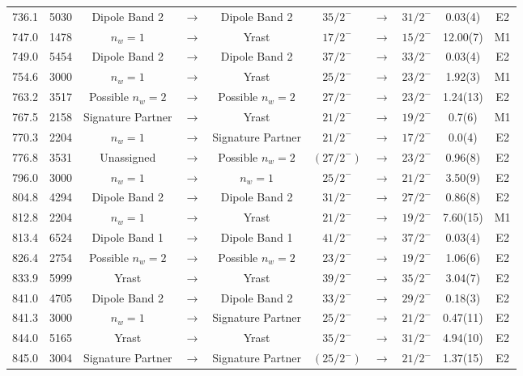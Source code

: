 \begin{landscape}
\begin{center}
\begin{longtable}{|c|c|ccc|ccc|c|c|}
 736.1&5030&Dipole Band 2&$ \rightarrow $&Dipole Band 2&$ 35/2^{-} $&$ \rightarrow $&$ 31/2^{-} $& 0.03(4)& E2 \\
 747.0&1478&$n_w=1$&$ \rightarrow $&Yrast&$ 17/2^{-} $&$ \rightarrow $&$ 15/2^{-} $& 12.00(7)& M1 \\
 749.0&5454&Dipole Band 2&$ \rightarrow $&Dipole Band 2&$ 37/2^{-} $&$ \rightarrow $&$ 33/2^{-} $& 0.03(4)& E2 \\
 754.6&3000&$n_w=1$&$ \rightarrow $&Yrast&$ 25/2^{-} $&$ \rightarrow $&$ 23/2^{-} $& 1.92(3)& M1 \\
 763.2&3517&Possible $n_w=2$&$ \rightarrow $&Possible $n_w=2$&$ 27/2^{-} $&$ \rightarrow $&$ 23/2^{-} $& 1.24(13)& E2 \\
 767.5&2158&Signature Partner&$ \rightarrow $&Yrast&$ 21/2^{-} $&$ \rightarrow $&$ 19/2^{-} $& 0.7(6)& M1 \\
 770.3&2204&$n_w=1$&$ \rightarrow $&Signature Partner&$ 21/2^{-} $&$ \rightarrow $&$ 17/2^{-} $& 0.0(4)& E2 \\
 776.8&3531&Unassigned&$ \rightarrow $&Possible $n_w=2$&$ (27/2^{-}) $&$ \rightarrow $&$ 23/2^{-} $& 0.96(8)& E2 \\
 796.0&3000&$n_w=1$&$ \rightarrow $&$n_w=1$&$ 25/2^{-} $&$ \rightarrow $&$ 21/2^{-} $& 3.50(9)& E2 \\
 804.8&4294&Dipole Band 2&$ \rightarrow $&Dipole Band 2&$ 31/2^{-} $&$ \rightarrow $&$ 27/2^{-} $& 0.86(8)& E2 \\
 812.8&2204&$n_w=1$&$ \rightarrow $&Yrast&$ 21/2^{-} $&$ \rightarrow $&$ 19/2^{-} $& 7.60(15)& M1 \\
 813.4&6524&Dipole Band 1&$ \rightarrow $&Dipole Band 1&$ 41/2^{-} $&$ \rightarrow $&$ 37/2^{-} $& 0.03(4)& E2 \\
 826.4&2754&Possible $n_w=2$&$ \rightarrow $&Possible $n_w=2$&$ 23/2^{-} $&$ \rightarrow $&$ 19/2^{-} $& 1.06(6)& E2 \\
 833.9&5999&Yrast&$ \rightarrow $&Yrast&$ 39/2^{-} $&$ \rightarrow $&$ 35/2^{-} $& 3.04(7)& E2 \\
 841.0&4705&Dipole Band 2&$ \rightarrow $&Dipole Band 2&$ 33/2^{-} $&$ \rightarrow $&$ 29/2^{-} $& 0.18(3)& E2 \\
 841.3&3000&$n_w=1$&$ \rightarrow $&Signature Partner&$ 25/2^{-} $&$ \rightarrow $&$ 21/2^{-} $& 0.47(11)& E2 \\
 844.0&5165&Yrast&$ \rightarrow $&Yrast&$ 35/2^{-} $&$ \rightarrow $&$ 31/2^{-} $& 4.94(10)& E2 \\
 845.0&3004&Signature Partner&$ \rightarrow $&Signature Partner&$ (25/2^{-}) $&$ \rightarrow $&$ 21/2^{-} $& 1.37(15)& E2 \\

\end{longtable}
\end{center}
\end{landscape}
